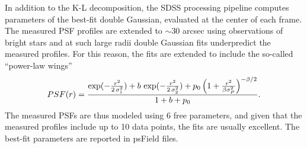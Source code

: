 In addition to the K-L decomposition, the SDSS processing pipeline computes parameters of the 
best-fit double Gaussian, evaluated at the center of each frame. The measured PSF profiles are 
extended to $\sim$30 arcsec using observations of bright stars and at such large radii 
double Gaussian fits underpredict the measured profiles. For this reason, the fits are extended 
to include the so-called ``power-law wings''
\begin{equation}
        PSF(r) = {\exp(-{r^2\over 2\,\sigma_1^2}) + b\,\exp(-{r^2\over 2\,\sigma_2^2})
           + p_0\left(1 + { r^2 \over \beta \sigma_P^2}\right)^{-\beta/2} \over 1 + b + p_0}.
\end{equation} 
The measured PSFs are thus modeled using 6 free parameters, and given that the measured
profiles include up to 10 data points, the fits are usually excellent. The best-fit parameters
are reported in psField files. 


